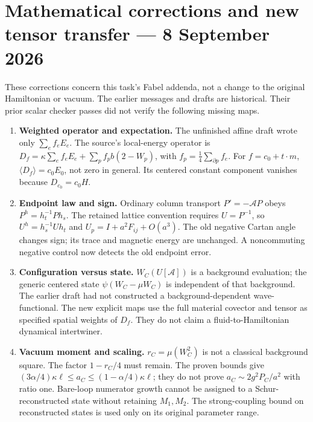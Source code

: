 \section{Mathematical corrections and new tensor transfer --- 8
September
2026}\label{fabel-corrections-20260908-md-mathematical-corrections-and-new-tensor-transfer-8-september-2026}

These corrections concern this task's Fabel addenda, not a change to the
original Hamiltonian or vacuum. The earlier messages and drafts are
historical. Their prior scalar checker passes did not verify the
following missing maps.

\begin{enumerate}
\def\labelenumi{\arabic{enumi}.}
\tightlist
\item
  \textbf{Weighted operator and expectation.} The unfinished affine
  draft wrote only \(\sum_e f_eE_e\). The source's local-energy operator
  is \(D_f=\kappa\sum_e f_eE_e+\sum_p f_pb(2-W_p)\), with
  \(f_p=\frac14\sum_{\partial p}f_e\). For \(f=c_0+t\cdot m\),
  \(\langle D_f\rangle=c_0E_0\), not zero in general. Its centered
  constant component vanishes because \(D_{c_0}=c_0H\).
\item
  \textbf{Endpoint law and sign.} Ordinary column transport
  \(P'=-\mathcal A P\) obeys \(P^h=h_t^{-1}Ph_s\). The retained lattice
  convention requires \(U=P^{-1}\), so \(U^h=h_s^{-1}Uh_t\) and
  \(U_p=I+a^2F_{ij}+O(a^3)\). The old negative Cartan angle changes
  sign; its trace and magnetic energy are unchanged. A noncommuting
  negative control now detects the old endpoint error.
\item
  \textbf{Configuration versus state.} \(W_C(U[\mathcal A])\) is a
  background evaluation; the generic centered state
  \(\psi(W_C-\mu W_C)\) is independent of that background. The earlier
  draft had not constructed a background-dependent wave-functional. The
  new explicit maps use the full material covector and tensor as
  specified spatial weights of \(D_f\). They do not claim a
  fluid-to-Hamiltonian dynamical intertwiner.
\item
  \textbf{Vacuum moment and scaling.} \(r_C=\mu(W_C^2)\) is not a
  classical background square. The factor \(1-r_C/4\) must remain. The
  proven bounds give
  \((3\alpha/4)\kappa\ell\le a_C\le(1-\alpha/4)\kappa\ell\); they do not
  prove \(a_C\sim2g^2P_C/a^2\) with ratio one. Bare-loop numerator
  growth cannot be assigned to a Schur-reconstructed state without
  retaining \(M_1,M_2\). The strong-coupling bound on reconstructed
  states is used only on its original parameter range.

\end{enumerate}
